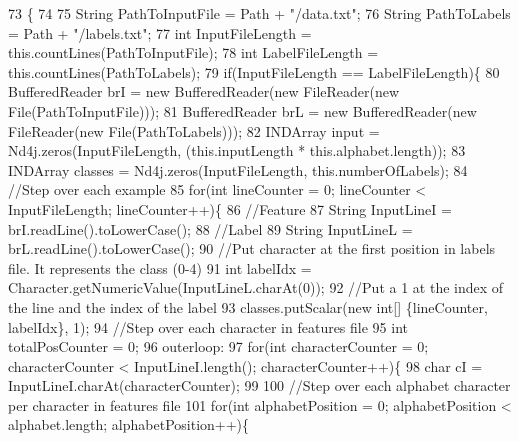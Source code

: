 \begin{DoxyCode}
73                                                             \{
74         
75         String PathToInputFile = Path + \textcolor{stringliteral}{"/data.txt"};
76         String PathToLabels = Path + \textcolor{stringliteral}{"/labels.txt"};
77         \textcolor{keywordtype}{int} InputFileLength = this.countLines(PathToInputFile);
78         \textcolor{keywordtype}{int} LabelFileLength = this.countLines(PathToLabels);
79         \textcolor{keywordflow}{if}(InputFileLength == LabelFileLength)\{
80             BufferedReader brI = \textcolor{keyword}{new} BufferedReader(\textcolor{keyword}{new} FileReader(\textcolor{keyword}{new} File(PathToInputFile)));
81             BufferedReader brL = \textcolor{keyword}{new} BufferedReader(\textcolor{keyword}{new} FileReader(\textcolor{keyword}{new} File(PathToLabels)));
82             INDArray input = Nd4j.zeros(InputFileLength, (this.inputLength * this.alphabet.length));
83             INDArray classes = Nd4j.zeros(InputFileLength, this.numberOfLabels);            
84             \textcolor{comment}{//Step over each example}
85             \textcolor{keywordflow}{for}(\textcolor{keywordtype}{int} lineCounter = 0; lineCounter < InputFileLength; lineCounter++)\{
86                 \textcolor{comment}{//Feature}
87                 String InputLineI = brI.readLine().toLowerCase();
88                 \textcolor{comment}{//Label}
89                 String InputLineL = brL.readLine().toLowerCase();
90                 \textcolor{comment}{//Put character at the first position in labels file. It represents the class (0-4)}
91                 \textcolor{keywordtype}{int} labelIdx = Character.getNumericValue(InputLineL.charAt(0));
92                 \textcolor{comment}{//Put a 1 at the index of the line and the index of the label}
93                 classes.putScalar(\textcolor{keyword}{new} \textcolor{keywordtype}{int}[] \{lineCounter, labelIdx\}, 1);
94                 \textcolor{comment}{//Step over each character in features file}
95                 \textcolor{keywordtype}{int} totalPosCounter = 0;
96                 outerloop:
97                 \textcolor{keywordflow}{for}(\textcolor{keywordtype}{int} characterCounter = 0; characterCounter < InputLineI.length(); characterCounter++)\{
98                     \textcolor{keywordtype}{char} cI = InputLineI.charAt(characterCounter);
99                     
100                     \textcolor{comment}{//Step over each alphabet character per character in features file}
101                     \textcolor{keywordflow}{for}(\textcolor{keywordtype}{int} alphabetPosition = 0; alphabetPosition < alphabet.length; alphabetPosition++)\{

\end{DoxyCode}
